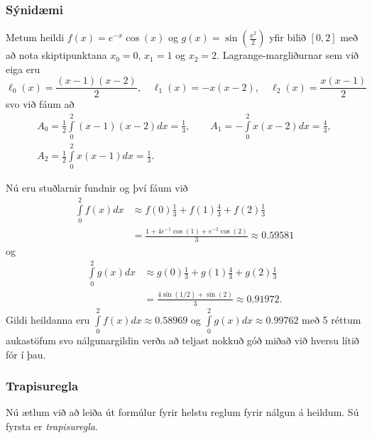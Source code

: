 \documentclass[icelandic,a4paper,12pt]{article}
\begin{document}
\subsubsection{Sýnidæmi} 
Metum heildi $f(x) = e^{-x}\cos(x)$ og $g(x) = \sin (\frac{x^2}{2})$
yfir bilið $[0,2]$ með að nota skiptipunktana $x_0 = 0$, $x_1 = 1$ og
$x_2 = 2$. Lagrange-margliðurnar sem við eiga eru 
\begin{equation*}
  \ell_0(x) = \frac{(x-1)(x-2)}{2}, \quad
  \ell_1(x) = -x(x-2), \quad
  \ell_2(x) = \frac{x(x-1)}{2}
\end{equation*}
\pause
svo við fáum að
\begin{gather*}
  A_0 = \frac{1}{2} \int\limits_0^2 (x-1)(x-2) dx = \frac{1}{3},
  \qquad
  A_1 = -\int\limits_0^2 x(x-2) dx = \frac{4}{3}, \\
  A_2 = \frac{1}{2} \int\limits_0^2 x(x-1) dx = \frac{1}{3}.
\end{gather*}



Nú eru stuðlarnir fundnir og því fáum við 
\begin{align*}
  \int\limits_0^2 f(x) dx &\approx
  f(0)\frac{1}{3} + f(1)\frac{4}{3} + f(2)\frac{1}{3}\\
  &= \frac{1 + 4e^{-1}\cos(1) + e^{-2}\cos(2)}{3}
  \approx 0.59581
\end{align*}
og
\begin{align*}
  \int\limits_0^2 g(x) dx &\approx
  g(0)\frac{1}{3} + g(1)\frac{4}{3} + g(2)\frac{1}{3}\\
 & = \frac{4\sin(1/2) + \sin(2)}{3} 
  \approx 0.91972.
\end{align*}
\pause
Gildi heildanna eru
$\int\limits_0^2 f(x) dx \approx 0.58969$
og $\int\limits_0^2 g(x) dx \approx 0.99762$ með 5 réttum auka\-stöfum
svo nálgunargildin verða að teljast nokkuð góð miðað við hversu 
lítið fór í þau.



\subsubsection{Trapisuregla} 
Nú ætlum við að leiða út formúlur fyrir helstu reglum fyrir nálgun á
heildum.  Sú fyrsta er {\it trapisuregla}.
\end{document}
